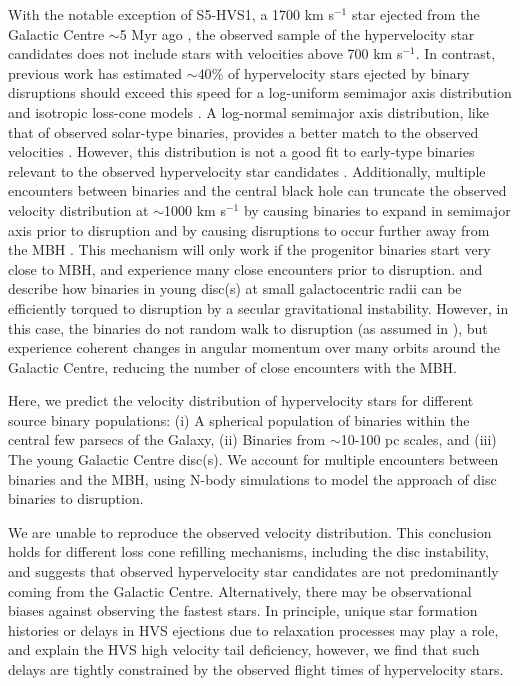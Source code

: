 \documentclass[fleqn,usenatbib]{mnras}
\begin{document}
With the notable exception of S5-HVS1, a 1700 km s$^{-1}$ star ejected from the Galactic Centre $\sim$5 Myr ago \citep{koposov+2019}, the observed sample of the hypervelocity star candidates does not include stars with velocities above 700 km s$^{-1}$. In contrast, previous work has estimated $\sim 40\%$ of hypervelocity stars ejected by binary disruptions should exceed this speed for a log-uniform semimajor axis distribution and isotropic loss-cone models \citep{rossi+2014}. A log-normal semimajor axis distribution, like that of observed solar-type binaries, provides a better match to the observed velocities \citep{sesana+2007_hvs}. However, this distribution is not a good fit to early-type binaries relevant to the observed hypervelocity star candidates \citep{moe+2017}. Additionally, multiple encounters between binaries and the central black hole can truncate the observed velocity distribution at $\sim$1000 km s$^{-1}$ by causing binaries to expand in semimajor axis prior to disruption and by causing disruptions to occur further away from the MBH \citep{zhang+2010_hvs, zhang+2013_hvs}.
This mechanism will only work if the progenitor binaries start very close to MBH, and experience many close encounters prior to disruption.  \citet{madigan+2009} and \citet{generozov&madigan2020} describe how  binaries in young disc(s) at small galactocentric radii \citep{levin&beloborodov03,paumard+2006} can be efficiently torqued to disruption by a secular gravitational instability. However, in this case, the binaries do not random walk to disruption (as assumed in \citealt{zhang+2010_hvs}), but experience coherent changes in angular momentum over many orbits around the Galactic Centre, reducing the number of close encounters with the MBH. 


Here, we predict the velocity distribution of hypervelocity stars for different source binary populations: (i) A spherical population of binaries within the central few parsecs of the Galaxy, (ii) Binaries from $\sim$10-100 pc scales, and (iii) The young Galactic Centre disc(s). We account for multiple encounters between binaries and the MBH, using N-body simulations to model the approach of disc binaries to disruption. 

We are unable to reproduce the observed velocity distribution. 
This conclusion holds for different loss cone refilling mechanisms, including the disc instability, and 
suggests that observed hypervelocity star candidates are not predominantly coming from the Galactic Centre. Alternatively, there may be observational biases against observing the fastest stars. 
In principle,  unique star formation histories or delays in HVS ejections due to relaxation processes may play a role, and explain the HVS high velocity tail deficiency, however, we find that such delays are tightly constrained by the observed flight times of hypervelocity stars.
\end{document}
